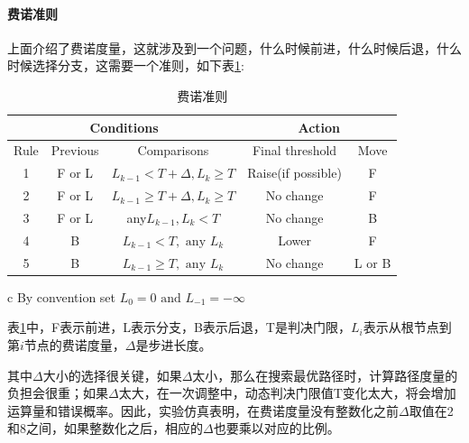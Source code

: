 \paragraph*{费诺准则\cite{Error_fano}}
上面介绍了费诺度量，这就涉及到一个问题，什么时候前进，什么时候后退，什么时候选择分支，这需要一个准则，如下表\ref{tab:3.4}:
\begin{table}
  \centering
  \caption{费诺准则}
  \label{tab:3.4}
  \begin{threeparttable}
  \begin{tabular}{ccccc}
    \hline
    \multicolumn{3}{c}{Conditions}&\multicolumn{2}{c}{Action}\\
    \hline
    Rule&Previous&Comparisons\tnote{c}&Final threshold&Move\\
    \hline
    1&F or L&$L_{k-1}<T+\Delta,L_k\ge T$&Raise(if possible)&F\\
    2&F or L&$L_{k-1}\ge T+\Delta,L_k\ge T$&No change&F\\
    3&F or L&any$L_{k-1},L_k<T$&No change&B\\
    4&B&$L_{k-1}<T,\mbox{~any~} L_k$&Lower&F\\
    5&B&$L_{k-1}\ge T,\mbox{~any~} L_k$&No change&L or B\\
    \hline
  \end{tabular}
  \begin{tablenotes}
    \footnotesize
  \item[c] By convention set $L_0=0 \mbox{~and~} L_{-1}=-\infty$
  \end{tablenotes}
\end{threeparttable}
\end{table}
表\ref{tab:3.4}中，F表示前进，L表示分支，B表示后退，T是判决门限，$L_i$表示从根节点到第$i$节点的费诺度量，$\Delta$是步进长度。

其中$\Delta$大小的选择很关键，如果$\Delta$太小，那么在搜索最优路径时，计算路径度量的负担会很重；如果$\Delta$太大，在一次调整中，动态判决门限值T变化太大，将会增加运算量和错误概率。因此，实验仿真表明，在费诺度量没有整数化之前$\Delta$取值在2和8之间，如果整数化之后，相应的$\Delta$也要乘以对应的比例。
